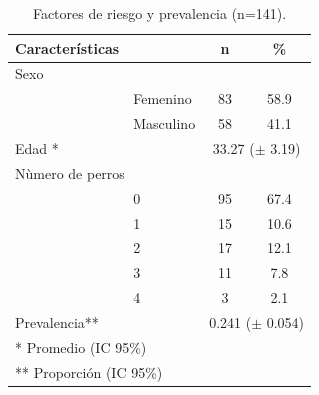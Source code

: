 \begin{table}[h]
	\centering
	\caption{Factores de riesgo y prevalencia (n=141).}\label{DescripFactRiesPrev}
	\begin{tabular}{llll}
		\toprule
		\textbf{Características} &       & \multicolumn{1}{c}{\textbf{n}} & \multicolumn{1}{c}{\textbf{\%}} \\
		\midrule
		\multicolumn{2}{l}{Sexo} &       &  \\
		& Femenino & \multicolumn{1}{c}{83} & \multicolumn{1}{c}{58.9} \\
		& Masculino & \multicolumn{1}{c}{58} & \multicolumn{1}{c}{41.1} \\
		\midrule
		\multicolumn{2}{l}{Edad *} & \multicolumn{2}{c}{33.27 ($\pm$ 3.19)} \\
		\midrule
		\multicolumn{2}{l}{Nùmero de perros} &       &  \\
		& 0     & \multicolumn{1}{c}{95} & \multicolumn{1}{c}{67.4} \\
		& 1     & \multicolumn{1}{c}{15} & \multicolumn{1}{c}{10.6} \\
		& 2     & \multicolumn{1}{c}{17} & \multicolumn{1}{c}{12.1} \\
		& 3     & \multicolumn{1}{c}{11} & \multicolumn{1}{c}{7.8} \\
		& 4     & \multicolumn{1}{c}{3} & \multicolumn{1}{c}{2.1} \\
		\midrule
		\multicolumn{2}{l}{Prevalencia**} & \multicolumn{2}{c}{0.241 ($\pm$ 0.054)} \\
		\midrule
		\multicolumn{4}{l}{* Promedio (IC 95\%)} \\
		\multicolumn{4}{l}{** Proporción (IC 95\%)} \\
	\end{tabular}%
\end{table}%

\newpage

